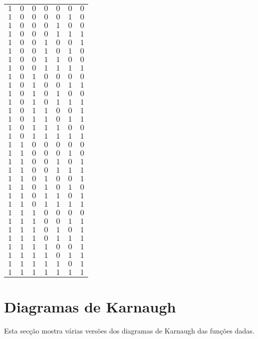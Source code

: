 \documentclass [15pt,a4paper,twoside]{article}
\begin{document}
\begin{center}
\begin{tabular}{cccccc|c}
$1$&$0$&$0$&$0$&$0$&$0$&$0$\\
$1$&$0$&$0$&$0$&$0$&$1$&$0$\\
$1$&$0$&$0$&$0$&$1$&$0$&$0$\\
$1$&$0$&$0$&$0$&$1$&$1$&$1$\\
$1$&$0$&$0$&$1$&$0$&$0$&$1$\\
$1$&$0$&$0$&$1$&$0$&$1$&$0$\\
$1$&$0$&$0$&$1$&$1$&$0$&$0$\\
$1$&$0$&$0$&$1$&$1$&$1$&$1$\\
$1$&$0$&$1$&$0$&$0$&$0$&$0$\\
$1$&$0$&$1$&$0$&$0$&$1$&$1$\\
$1$&$0$&$1$&$0$&$1$&$0$&$0$\\
$1$&$0$&$1$&$0$&$1$&$1$&$1$\\
$1$&$0$&$1$&$1$&$0$&$0$&$1$\\
$1$&$0$&$1$&$1$&$0$&$1$&$1$\\
$1$&$0$&$1$&$1$&$1$&$0$&$0$\\
$1$&$0$&$1$&$1$&$1$&$1$&$1$\\
$1$&$1$&$0$&$0$&$0$&$0$&$0$\\
$1$&$1$&$0$&$0$&$0$&$1$&$0$\\
$1$&$1$&$0$&$0$&$1$&$0$&$1$\\
$1$&$1$&$0$&$0$&$1$&$1$&$1$\\
$1$&$1$&$0$&$1$&$0$&$0$&$1$\\
$1$&$1$&$0$&$1$&$0$&$1$&$0$\\
$1$&$1$&$0$&$1$&$1$&$0$&$1$\\
$1$&$1$&$0$&$1$&$1$&$1$&$1$\\
$1$&$1$&$1$&$0$&$0$&$0$&$0$\\
$1$&$1$&$1$&$0$&$0$&$1$&$1$\\
$1$&$1$&$1$&$0$&$1$&$0$&$1$\\
$1$&$1$&$1$&$0$&$1$&$1$&$1$\\
$1$&$1$&$1$&$1$&$0$&$0$&$1$\\
$1$&$1$&$1$&$1$&$0$&$1$&$1$\\
$1$&$1$&$1$&$1$&$1$&$0$&$1$\\
$1$&$1$&$1$&$1$&$1$&$1$&$1$\\

\end{tabular}
\end{center}
\section{Diagramas de Karnaugh}
Esta secção mostra várias versões dos diagramas de Karnaugh das funções dadas.
\end{document}

